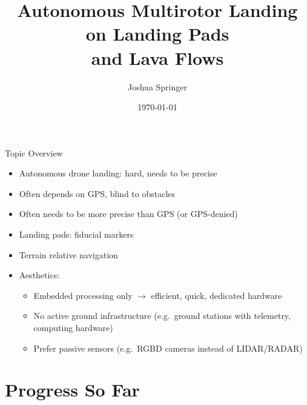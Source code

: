 \documentclass[aspectratio=169]{beamer}
\title{Autonomous Multirotor Landing on Landing Pads\\and Lava Flows}
\author{Joshua Springer}
\institute{Reykjavik University\\Department of Computer Science\\Supervisor: Marcel Kyas}
\date{\specialdate\today}
\newcommand{\nologo}{\setbeamertemplate{logo}{}}
\begin{document}
\maketitle

\nologo

\begin{frame}{Topic Overview}
	\begin{itemize}
		\item Autonomous drone landing: hard, needs to be precise
		\item Often depends on GPS, blind to obstacles
		\item Often needs to be more precise than GPS (or GPS-denied)
		\item Landing pads: fiducial markers
		\item Terrain relative navigation
		\item Aesthetics:
		\begin{itemize}
			\item Embedded processing only $\rightarrow$ efficient, quick, dedicated hardware
			\item No active ground infrastructure (e.g.~ground stations with telemetry, computing hardware)
			\item Prefer passive sensors (e.g.~RGBD cameras instead of LIDAR/RADAR)
		\end{itemize}
	\end{itemize}
\end{frame}

\section{Progress So Far}
\end{document}
